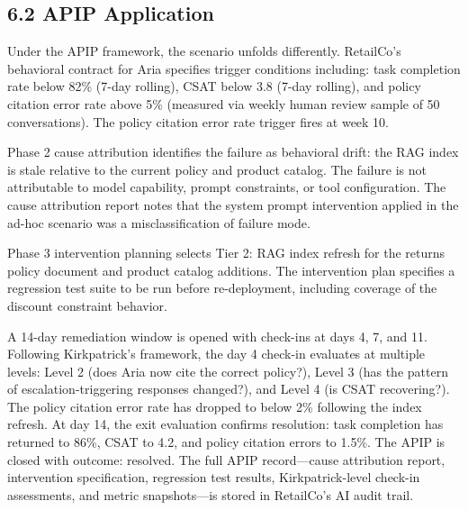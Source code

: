 \subsection{6.2  APIP Application}

Under the APIP framework, the scenario unfolds differently. RetailCo's behavioral contract for Aria specifies trigger conditions including: task completion rate below 82\% (7-day rolling), CSAT below 3.8 (7-day rolling), and policy citation error rate above 5\% (measured via weekly human review sample of 50 conversations). The policy citation error rate trigger fires at week 10.

Phase 2 cause attribution identifies the failure as behavioral drift: the RAG index is stale relative to the current policy and product catalog. The failure is not attributable to model capability, prompt constraints, or tool configuration. The cause attribution report notes that the system prompt intervention applied in the ad-hoc scenario was a misclassification of failure mode.

Phase 3 intervention planning selects Tier 2: RAG index refresh for the returns policy document and product catalog additions. The intervention plan specifies a regression test suite to be run before re-deployment, including coverage of the discount constraint behavior.

A 14-day remediation window is opened with check-ins at days 4, 7, and 11. Following Kirkpatrick's framework, the day 4 check-in evaluates at multiple levels: Level 2 (does Aria now cite the correct policy?), Level 3 (has the pattern of escalation-triggering responses changed?), and Level 4 (is CSAT recovering?). The policy citation error rate has dropped to below 2\% following the index refresh. At day 14, the exit evaluation confirms resolution: task completion has returned to 86\%, CSAT to 4.2, and policy citation errors to 1.5\%. The APIP is closed with outcome: resolved. The full APIP record---cause attribution report, intervention specification, regression test results, Kirkpatrick-level check-in assessments, and metric snapshots---is stored in RetailCo's AI audit trail.

